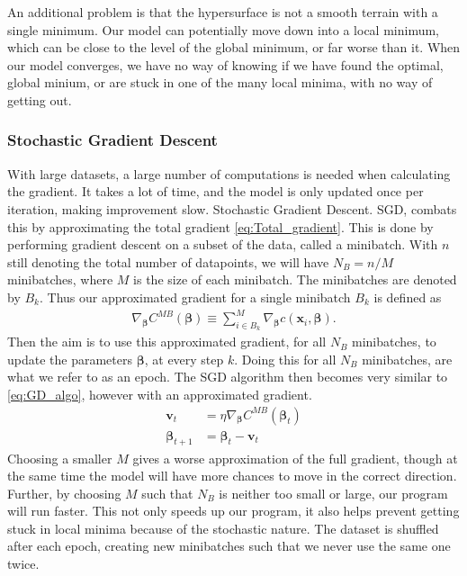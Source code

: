 \documentclass[12pt]{extarticle}
\begin{document}
An additional problem is that the  hypersurface is not a smooth terrain with a single minimum. Our model can potentially move down into a local minimum, which can be close to the level of the global minimum, or far worse than it. When our model converges, we have no way of knowing if we have found the optimal, global minium, or are stuck in one of the many local minima, with no way of getting out.


\subsubsection{Stochastic Gradient Descent}\label{sec:SGD}
With large datasets, a large number of computations is needed when calculating the gradient. It takes a lot of time, and the model is only updated once per iteration, making improvement slow. Stochastic Gradient Descent. SGD, combats this by approximating the total gradient \eqref{eq:Total_gradient}. This is done by performing  gradient descent on a subset of the data, called a minibatch. With $n$ still denoting the total number of datapoints, we will have $N_B=n/M$ minibatches, where $M$ is the size of each minibatch. The minibatches are denoted by $B_k$. Thus our approximated gradient for a single minibatch $B_k$ is defined as
\begin{align}
	\nabla_{\boldsymbol{\beta}} C^{MB}(\boldsymbol{\beta}) \equiv \sum_{i \in B_k}^M \nabla_{\boldsymbol{\beta}} c(\mathbf{x}_i, \boldsymbol{\beta}).
\end{align}
Then the aim is to use this approximated gradient, for all $N_B$ minibatches, to update the parameters $\boldsymbol{\beta}$, at every step $k$. Doing this for all $N_B$ minibatches, are what we refer to as an epoch. The SGD algorithm then becomes very similar to \eqref{eq:GD_algo}, however with an approximated gradient.
\begin{align}
	\mathbf{v}_t             & = \eta\nabla_{\boldsymbol{\beta}} C^{MB}(\boldsymbol{\beta}_t) \nonumber \\
	\boldsymbol{\beta}_{t+1} & = \boldsymbol{\beta}_t - \mathbf{v}_t
	\label{eq:SGD_algo}
\end{align}
Choosing a smaller $M$ gives a worse approximation of the full gradient, though at the same time the model will have more chances to move in the correct direction. Further, by choosing $M$ such that $N_B$ is neither too small or large, our program will run faster. This not only speeds up our program, it also helps prevent getting stuck in local minima because of the stochastic nature. The dataset is shuffled after each epoch, creating new minibatches such that we never use the same one twice.
\end{document}
